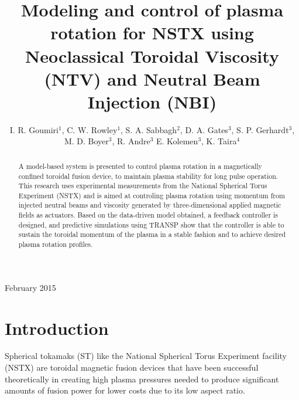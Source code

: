\documentclass[12pt]{iopart}
\begin{document}
\title[Modeling and control of plasma rotation using NTV and NBI]{Modeling and control of plasma rotation for NSTX using Neoclassical Toroidal Viscosity (NTV) and Neutral Beam Injection (NBI)}

\author{I. R. Goumiri$^1$, C. W. Rowley$^1$, S. A. Sabbagh$^2$, D. A. Gates$^3$, S. P. Gerhardt$^3$, M. D. Boyer$^3$, R. Andre$^3$  E. Kolemen$^3$, K. Taira$^4$ }

 \address{$^1$ Department of Mechanical and Aerospace Engineering, Princeton University, Princeton, NJ 08544, USA}
 \address{$^2$ Department of Applied Physics and Applied Mathematics, Columbia University, New York, NY 10027, USA}
\address{$^3$ Princeton Plasma Physics Laboratory, Princeton, NJ 08544, USA}
\address{$^4$ Florida Center for Advanced Aero-Propulsion, Florida State University, Tallahassee, Florida 32310, USA}

\vspace{10pt}
\begin{indented}
\item[]February 2015
\end{indented}

\begin{abstract}
A model-based system is presented to control plasma rotation in a magnetically confined toroidal fusion device, to maintain plasma stability for long pulse operation. This research uses experimental measurements from the National Spherical Torus Experiment (NSTX) and is aimed at controling plasma rotation using momentum from injected neutral beams and viscosity generated by three-dimensional applied magnetic fields as actuators. Based on the data-driven model obtained, a feedback controller is designed, and predictive simulations using TRANSP show that the controller is able to sustain the toroidal momentum of the plasma in a stable fashion and to achieve desired plasma rotation profiles.
 
\end{abstract}



\section{Introduction}

Spherical tokamaks (ST) like the National Spherical Torus Experiment facility (NSTX) are toroidal magnetic fusion devices that have been successful theoretically in creating high plasma pressures needed to produce significant amounts of fusion power for lower costs due to its low aspect ratio. 
\end{document}
